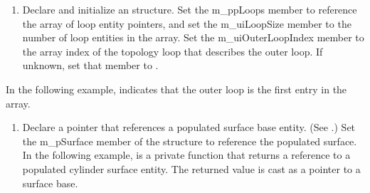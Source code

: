 \documentclass[letterpaper,12pt,english,openany,oneside]{sphinxmanual}
\begin{document}
\begin{sphinxVerbatim}[commandchars=\\\{\}]
   
   
 \PYG{p}{[}\PYG{p}{]}
\PYG{p}{[}\PYG{p}{]}  
\PYG{p}{[}\PYG{p}{]}  
\end{sphinxVerbatim}
\begin{enumerate}
%
\setcounter{enumi}{3}
\item {} 
Declare and initialize an  structure. Set the m\_ppLoops member to reference the array of loop entity pointers, and set the m\_uiLoopSize member to the number of loop entities in the array. Set the m\_uiOuterLoopIndex member to the array index of the topology loop that describes the outer loop. If unknown, set that member to .

\end{enumerate}

In the following example,  indicates that the outer loop is the first entry in the  array.

\begin{sphinxVerbatim}[commandchars=\\\{\}]
 
  
  
  
\end{sphinxVerbatim}
\begin{enumerate}
%
\setcounter{enumi}{4}
\item {} 
Declare a pointer that references a populated surface base entity. (See .) Set the m\_pSurface member of the  structure to reference the populated surface. In the following example,  is a private function that returns a reference to a populated cylinder surface entity. The returned value is cast as a pointer to a surface base.

\end{enumerate}
\end{document}
